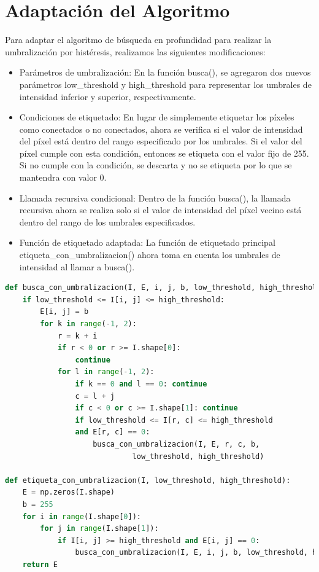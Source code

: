 \documentclass[11pt]{article}
\begin{document}
    \section{Adaptación del Algoritmo}
    Para adaptar el algoritmo de búsqueda en profundidad para realizar la umbralización por histéresis, realizamos las siguientes modificaciones:
    \begin{itemize}
        \item Parámetros de umbralización: En la función busca(), se agregaron dos nuevos parámetros low\_threshold y high\_threshold para representar
        los umbrales de intensidad inferior y superior, respectivamente.
        \item Condiciones de etiquetado: En lugar de simplemente etiquetar los píxeles como conectados o no conectados, ahora se verifica
        si el valor de intensidad del píxel está dentro del rango especificado por los umbrales. Si el valor del píxel cumple con esta condición,
        entonces se etiqueta con el valor fijo de 255. Si no cumple con la condición, se descarta y no se etiqueta por lo que se mantendra con valor 0.
        \item Llamada recursiva condicional: Dentro de la función busca(), la llamada recursiva ahora se realiza solo si el valor de intensidad del píxel vecino
        está dentro del rango de los umbrales especificados.
        \item Función de etiquetado adaptada: La función de etiquetado principal etiqueta\_con\_umbralizacion() ahora toma en cuenta los umbrales de intensidad al llamar a busca().
    \end{itemize}

    \begin{lstlisting}[language=Python, caption=Función de Umbralización por Histéresis en Python]
def busca_con_umbralizacion(I, E, i, j, b, low_threshold, high_threshold):
    if low_threshold <= I[i, j] <= high_threshold:
        E[i, j] = b
        for k in range(-1, 2):
            r = k + i
            if r < 0 or r >= I.shape[0]:
                continue
            for l in range(-1, 2):
                if k == 0 and l == 0: continue
                c = l + j
                if c < 0 or c >= I.shape[1]: continue
                if low_threshold <= I[r, c] <= high_threshold
                and E[r, c] == 0:
                    busca_con_umbralizacion(I, E, r, c, b,
                             low_threshold, high_threshold)

def etiqueta_con_umbralizacion(I, low_threshold, high_threshold):
    E = np.zeros(I.shape)
    b = 255
    for i in range(I.shape[0]):
        for j in range(I.shape[1]):
            if I[i, j] >= high_threshold and E[i, j] == 0:
                busca_con_umbralizacion(I, E, i, j, b, low_threshold, high_threshold)
    return E
    \end{lstlisting}
\end{document}
